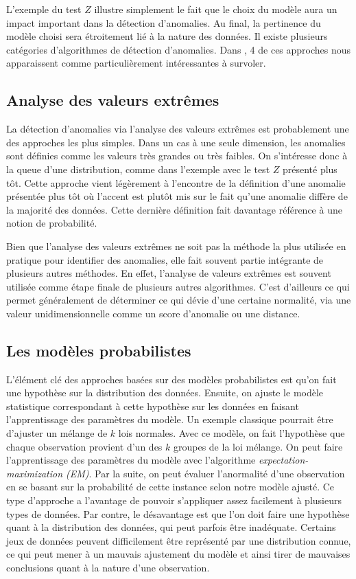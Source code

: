 L'exemple du test $Z$ illustre simplement le fait que le choix du modèle aura un impact important dans la détection d'anomalies. Au final, la pertinence du modèle choisi sera étroitement lié à la nature des données. Il existe plusieurs catégories d'algorithmes de détection d'anomalies. Dans \cite{10.5555/3086742}, 4 de ces approches nous apparaissent comme particulièrement intéressantes à survoler.

\subsection{Analyse des valeurs extrêmes}

La détection d'anomalies via l'analyse des valeurs extrêmes est probablement une des approches les plus simples. Dans un cas à une seule dimension, les anomalies sont définies comme les valeurs très grandes ou très faibles. On s'intéresse donc à la queue d'une distribution, comme dans l'exemple avec le test $Z$ présenté plus tôt. Cette approche vient légèrement à l'encontre de la définition d'une anomalie présentée plus tôt où l'accent est plutôt mis sur le fait qu'une anomalie diffère de la majorité des données. Cette dernière définition fait davantage référence à une notion de probabilité.

Bien que l'analyse des valeurs extrêmes ne soit pas la méthode la plus utilisée en pratique pour identifier des anomalies, elle fait souvent partie intégrante de plusieurs autres méthodes. En effet, l'analyse de valeurs extrêmes est souvent utilisée comme étape finale de plusieurs autres algorithmes. C'est d'ailleurs ce qui permet généralement de déterminer ce qui dévie d'une certaine normalité, via une valeur unidimensionnelle comme un score d'anomalie ou une distance.


\subsection{Les modèles probabilistes}

L'élément clé des approches basées sur des modèles probabilistes  est qu'on fait une hypothèse sur la distribution des données. Ensuite, on ajuste le modèle statistique correspondant à cette hypothèse sur les données en faisant l'apprentissage des paramètres du modèle. Un exemple classique pourrait être d'ajuster un mélange de $k$ lois normales. Avec ce modèle, on fait l'hypothèse que chaque observation provient d'un des $k$ groupes de la loi mélange. On peut faire l'apprentissage des paramètres du modèle avec l'algorithme \textit{expectation-maximization (EM)}. Par la suite, on peut évaluer l'anormalité d'une observation en se basant sur la probabilité de cette instance selon notre modèle ajusté. Ce type d'approche a l'avantage de pouvoir s'appliquer assez facilement à plusieurs types de données. Par contre, le désavantage est que l'on doit faire une hypothèse quant à la distribution des données, qui peut parfois être inadéquate. Certains jeux de données peuvent difficilement être représenté par une distribution connue, ce qui peut mener à un mauvais ajustement du modèle et ainsi tirer de mauvaises conclusions quant à la nature d'une observation.

